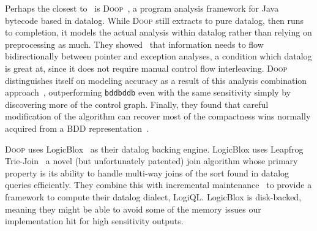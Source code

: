 Perhaps the closest to \aliasname\ is \textsc{Doop}~\cite{doop1,doop2,doop3}, a program analysis framework for Java bytecode based in datalog.
While \textsc{Doop} still extracts to pure datalog, then runs to completion, it models the actual analysis within datalog rather than relying on preprocessing as much.
They showed~\cite{doop1} that information needs to flow bidirectionally between pointer and exception analyses, a condition which datalog is great at, since it does not require manual control flow interleaving.
\textsc{Doop} distinguishes itself on modeling accuracy as a result of this analysis combination approach~\cite{doop2}, outperforming \texttt{bddbddb} even with the same sensitivity simply by discovering more of the control graph.
Finally, they found that careful modification of the algorithm can recover most of the compactness wins normally acquired from a BDD representation~\cite{doop3}.

\textsc{Doop} uses LogicBlox~\cite{logicblox} as their datalog backing engine.
LogicBlox uses Leapfrog Trie-Join~\cite{lftj} a novel (but unfortunately patented) join algorithm whose primary property is its ability to handle multi-way joins of the sort found in datalog queries efficiently.
They combine this with incremental maintenance~\cite{lftj-incr} to provide a framework to compute their datalog dialect, LogiQL.
LogicBlox is disk-backed, meaning they might be able to avoid some of the memory issues our implementation hit for high sensitivity outputs.
